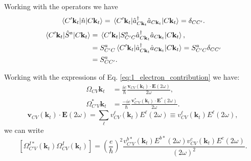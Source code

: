 \documentclass{article}
\newcommand{\kt}{\mathbf{k}_{t}}
\begin{document}
Working with the operators we have 
\begin{align}
\mel*{C'\kt}{\hat{n}}{C\kt}
= \mel*{C'\kt}{\hat{a}^{\dag}_{C\kt} \hat{a}_{C\kt}}{C\kt} = \delta_{CC'} . \label{eq:op_n}
\end{align}
\begin{align}
\mel*{C'\kt}{\hat{S}^{a}}{C\kt}
&= \mel*{C'\kt}{S^{a}_{C'C}\hat{a}^{\dag}_{C\kt} \hat{a}_{C\kt}}{C\kt} , \nonumber \\
&= S^{a}_{C'C}\mel*{C'\kt}{\hat{a}^{\dag}_{C\kt} \hat{a}_{C\kt}}{C\kt}
= S^{a}_{C'C}\delta_{CC'} \nonumber \\
&= S^{a}_{CC'} . \label{eq:op_S}
\end{align}

Working with the expressions of Eq. \eqref{eq:1_electron_contribution}
we have: 
\begin{align*}\label{eq:omegaICV_omegaI*VpV}
\Omega_{CV}{\kt} &= \frac{ie}{\hbar}
\frac{\mathbf{v}_{CV}(\kt) \cdot \mathbf{E}(2\omega)}{2\omega} , \\
\Omega^{*}_{C'V}{\kt} &= \frac{-ie}{\hbar}
\frac{\mathbf{v}^{*}_{C'V}(\kt) \cdot \mathbf{E}^{*}(2\omega)}{2\omega} .
\end{align*}
\begin{equation}\label{eq:dot_product}
\mathbf{v}_{CV}(\kt) \cdot \mathbf{E}(2\omega)
= \sum_{\ell} v^{\ell}_{CV}(\kt) E^{\ell}(2\omega) \equiv v^{\ell}_{CV}(\kt)
E^{\ell}(2\omega) ,
\end{equation}
we can write 
\begin{equation}\label{eq:omegaI*CpV_omegaICV_product}
[\Omega^{I*}_{C'V}(\kt) \Omega^{I}_{CV}(\kt)] =
\left( \frac{e}{\hbar} \right)^{2} 
\frac{v^{b*}_{C'V}(\kt)E^{b*}(2\omega)v^{c}_{CV}(\kt)E^{c}(2\omega)}{(2\omega)^{2}} .
\end{equation}
\end{document}
